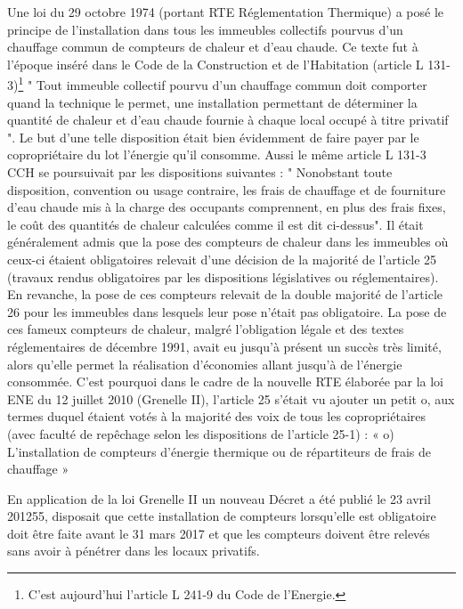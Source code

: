 		Une loi du 29 octobre 1974 (portant RTE Réglementation Thermique) a posé le principe de l'installation dans tous les immeubles collectifs pourvus d'un chauffage commun de compteurs de chaleur et d'eau chaude. Ce texte fut à l’époque inséré dans le Code de la Construction et de l'Habitation (article L 131-3)\footnote{C’est aujourd’hui l’article L 241-9 du Code de l’Energie.}
		" Tout immeuble collectif pourvu d'un chauffage commun doit comporter quand la technique le permet, une installation permettant de déterminer la quantité de chaleur et d'eau chaude fournie à chaque local occupé à titre privatif ".
		Le but d'une telle disposition était bien évidemment de faire payer par le copropriétaire du lot l'énergie qu'il consomme. Aussi le même article L 131-3 CCH se poursuivait par les dispositions suivantes :
		" Nonobstant toute disposition, convention ou usage contraire, les frais de chauffage et de fourniture d'eau chaude mis à la charge des occupants comprennent, en plus des frais fixes, le coût des quantités de chaleur calculées comme il est dit ci-dessus".
		Il était généralement admis que la pose des compteurs de chaleur dans les immeubles où ceux-ci étaient obligatoires relevait d'une décision de la majorité de l'article 25 (travaux rendus obligatoires par les dispositions législatives ou réglementaires). En revanche, la pose de ces compteurs relevait de la double majorité de l'article 26 pour les immeubles dans lesquels leur pose n'était pas obligatoire.
		La pose de ces fameux compteurs de chaleur, malgré l'obligation légale et des textes réglementaires de décembre 1991, avait eu jusqu'à présent un succès très limité, alors qu'elle permet la réalisation d'économies allant jusqu'à  de l'énergie consommée. C’est pourquoi dans le cadre de la nouvelle RTE élaborée par la loi ENE du 12 juillet 2010 (Grenelle II), l’article 25 s’était vu ajouter un petit o, aux termes duquel étaient votés à la majorité des voix de tous les copropriétaires (avec faculté de repêchage selon les dispositions de l’article 25-1) : « o) L'installation de compteurs d'énergie thermique ou de répartiteurs de frais de chauffage »

		En application de la loi Grenelle II un nouveau Décret a été publié le 23 avril 201255, disposait que cette installation de compteurs lorsqu’elle est obligatoire doit être faite avant le 31 mars 2017 et que les compteurs doivent être relevés sans avoir à pénétrer dans les locaux privatifs.
		
